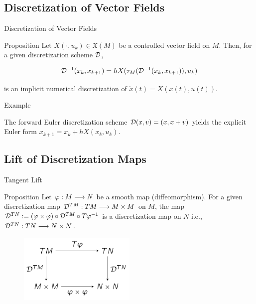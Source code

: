 \documentclass{beamer}
\begin{document}
\subsection{Discretization of Vector Fields}
\begin{frame}{Discretization of Vector Fields}
  \begin{block}{Proposition}
    Let $X(\cdot, u_k) \in \mathfrak{X}(M)$ be a controlled vector field on $M$. Then, for a given discretization scheme $\mathcal{D}$,

    \[
      \mathcal{D}^{-1}(x_k, x_{k+1}) = hX(\tau_M(\mathcal{D}^{-1}(x_k, x_{k+1})), u_k)
    \]

    is an implicit numerical discretization of $\dot{x}(t) = X(x(t), u(t))$.
  \end{block}


  \begin{block}{Example}

    The forward Euler discretization scheme $\mathcal{D}(x,v) = (x, x + v)$ yields the explicit Euler form $x_{k+1} = x_k + hX(x_k, u_k)$.
    
  \end{block}
  
\end{frame}

\subsection{Lift of Discretization Maps}
\begin{frame}{Tangent Lift}
  \begin{block}{Proposition}
    Let $\varphi: M \longrightarrow N$ be a smooth map (diffeomorphism). For a given discretization map $\mathcal{D}^{TM} : TM \longrightarrow M \times M$ on $M$, the map $\mathcal{D}^{TN} :=  (\varphi \times \varphi) \circ \mathcal{D}^{TM} \circ T \varphi ^{-1}$ is a discretization map on $N$ i.e., $\mathcal{D}^{TN} : TN \longrightarrow N \times N$.
  \end{block}

  \begin{figure}[h]
    \centering
    \includegraphics[width=0.5\textwidth]{../Figures/commutator.png}
  \end{figure}
\end{frame}
\end{document}
